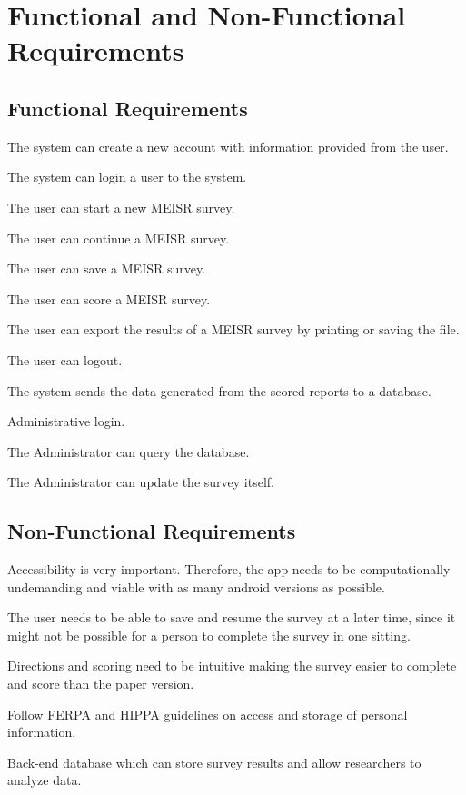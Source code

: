 \chapter{Functional and Non-Functional Requirements}
\label{ch:Functional and Non-Functional Requirements}

\section{Functional Requirements}

The system can create a new account with information provided from the user.

The system can login a user to the system.

The user can start a new MEISR survey.

The user can continue a MEISR survey.

The user can save a MEISR survey.

The user can score a MEISR survey.

The user can export the results of a MEISR survey by printing or saving the file.

The user can logout.

The system sends the data generated from the scored reports to a database.

Administrative login.

The Administrator can query the database.

The Administrator can update the survey itself.

\section{Non-Functional Requirements}


Accessibility is very important. Therefore, the app needs to be computationally undemanding and viable with as many android versions as possible.

The user needs to be able to save and resume the survey at a later time, since it might not be possible for a person to complete the survey in one sitting.

Directions and scoring need to be intuitive making the survey easier to complete and score than the paper version.

Follow FERPA and HIPPA guidelines on access and storage of personal information.

Back-end database which can store survey results and allow researchers to analyze data.

